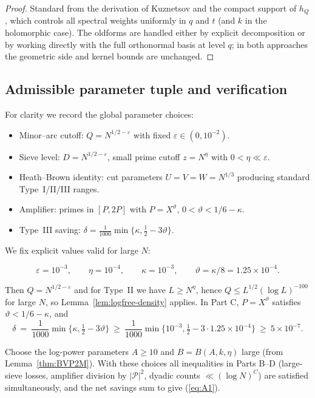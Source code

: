 \documentclass[11pt]{article}
\def\eqref#1{(\ref{#1})}%
\theoremstyle{definition}
\theoremstyle{remark}
\numberwithin{equation}{part}
\begin{document}
\begin{proof}
	Standard from the derivation of Kuznetsov and the compact support of $h_Q$, which controls all spectral weights uniformly in $q$ and $t$ (and $k$ in the holomorphic case). The oldforms are handled either by explicit decomposition or by working directly with the full orthonormal basis at level $q$; in both approaches the geometric side and kernel bounds are unchanged.
\end{proof}

\subsection{Admissible parameter tuple and verification}

For clarity we record the global parameter choices:
\begin{itemize}
	\item Minor--arc cutoff: $Q=N^{1/2-\varepsilon}$ with fixed $\varepsilon\in(0,10^{-2})$.
	\item Sieve level: $D=N^{1/2-\varepsilon}$, small prime cutoff $z=N^\eta$ with $0<\eta\ll\varepsilon$.
	\item Heath--Brown identity: cut parameters $U=V=W=N^{1/3}$ producing standard Type~I/II/III ranges.
	\item Amplifier: primes in $[P,2P]$ with $P=X^\vartheta$, $0<\vartheta<1/6-\kappa$.
	\item Type~III saving: $\delta=\tfrac{1}{1000}\min\{\kappa,\tfrac12-3\vartheta\}$.
\end{itemize}


We fix explicit values valid for large $N$:

\[
	\varepsilon=10^{-3},\qquad \eta=10^{-4},\qquad \kappa=10^{-3},\qquad \vartheta=\kappa/8=1.25\times 10^{-4}.
\]

Then $Q=N^{1/2-\varepsilon}$ and for Type~II we have $L\ge N^{\eta}$, hence $Q\le L^{1/2}(\log L)^{-100}$ for large $N$, so Lemma~\ref{lem:logfree-density} applies. In Part C, $P=X^{\vartheta}$ satisfies $\vartheta<1/6-\kappa$, and
\[
	\delta\ =\ \frac1{1000}\min\{\kappa,\tfrac12-3\vartheta\}\ \ge\ \frac{1}{1000}\min\{10^{-3},\tfrac12-3\cdot 1.25\times 10^{-4}\}\ \ge\ 5\times 10^{-7}.
\]

Choose the log-power parameters $A\ge 10$ and $B=B(A,k,\eta)$ large (from Lemma~\ref{thm:BVP2M}). With these choices all inequalities in Parts B--D (large-sieve losses, amplifier division by $|\mathcal P|^2$, dyadic counts $\ll (\log N)^C$) are satisfied simultaneously, and the net savings sum to give \eqref{eq:A1}.
\end{document}
